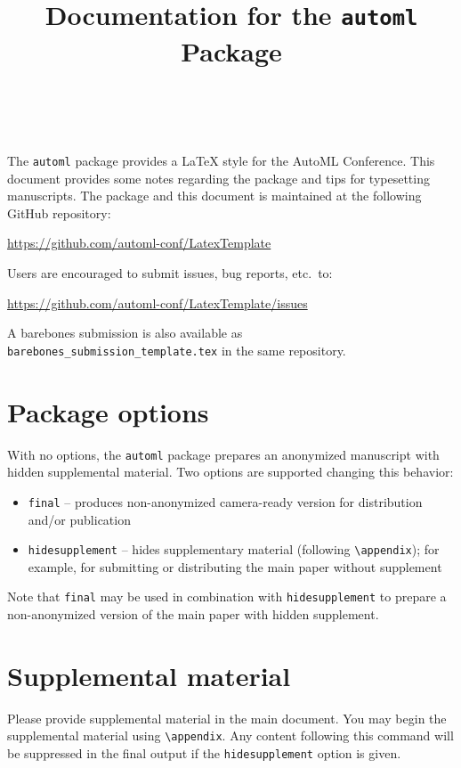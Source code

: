 \documentclass[11pt]{article}
\title{Documentation for the \texttt{automl} Package}
\author[1]{\nameemail{Author 1}{email1@example.com}}
\author[2,3]{\nameemail{Author 2}{email2@example.com}}
\author[3]{\nameemail{Author 3}{email3@example.com}}
\author[4]{\nameemail{Author 4}{email4@example.com}}
\author[3]{\\\nameemail{Author 5}{email5@example.com}}
\affil[1]{Institution 1}
\affil[2]{Institution 2}
\affil[3]{Institution 3}
\affil[4]{Institution 4}
\begin{document}
\maketitle

\begin{abstract}

\end{abstract}

The \texttt{automl} package provides a \LaTeX{} style for the AutoML Conference.
This document provides some notes regarding the package and tips for typesetting
manuscripts. The package and this document is maintained at the following GitHub
repository:
\begin{center}
  \url{https://github.com/automl-conf/LatexTemplate}
\end{center}
Users are encouraged to submit issues, bug reports, etc.\ to:
\begin{center}
  \url{https://github.com/automl-conf/LatexTemplate/issues}
\end{center}
A barebones submission is also available as \texttt{barebones\_submission\_template.tex} in the same
repository.

\section{Package options}

With no options, the \texttt{automl} package prepares an anonymized manuscript
with hidden supplemental material. Two options are supported changing this
behavior:
\begin{itemize}
\item \texttt{final} -- produces non-anonymized camera-ready version for
  distribution and/or publication
\item \texttt{hidesupplement} -- hides supplementary material (following
  \verb|\appendix|); for example, for submitting or distributing the main paper
  without supplement
\end{itemize}
Note that \texttt{final} may be used in combination with  \texttt{hidesupplement}
to prepare a non-anonymized version of the main paper with hidden supplement.

\section{Supplemental material}

Please provide supplemental material in the main document. You may begin the
supplemental material using \verb|\appendix|. Any content following this command
will be suppressed in the final output if the \texttt{hidesupplement} option is
given.
\end{document}
